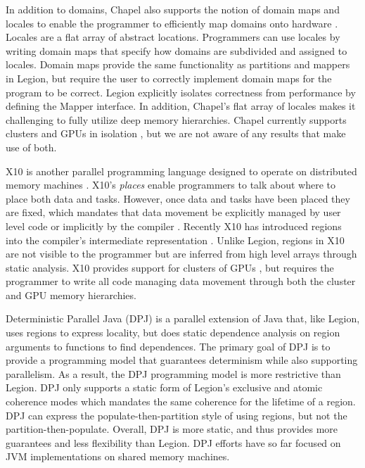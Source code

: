 In addition to domains, Chapel also supports the notion of domain maps and locales to enable 
the programmer to efficiently map domains onto hardware \cite{CHAPEL11}.  Locales are a flat array
of abstract locations.  Programmers can use locales by writing domain maps that specify
how domains are subdivided and assigned to locales.  Domain maps provide the same functionality
as partitions and mappers in Legion, but require the user to correctly implement domain
maps for the program to be correct.  Legion explicitly isolates correctness
from performance by defining the Mapper interface.  In addition, Chapel's flat array of locales
makes it challenging to fully utilize deep memory hierarchies.  Chapel currently supports
clusters and GPUs in isolation \cite{CHAPELGPU}, but we are not aware of any results that 
make use of both.

X10 is another parallel programming language designed to operate on
distributed memory machines \cite{X1005}.  X10's {\em places} enable
programmers to talk about where to place both data and tasks.
However, once data and tasks have been placed they are fixed, which
mandates that data movement be explicitly managed by user level code
or implicitly by the compiler \cite{X1008}.  Recently X10
has introduced regions into the compiler's
intermediate representation \cite{X1011}.  Unlike Legion, regions in
X10 are not visible to the programmer but are inferred from high level
arrays through static analysis.  X10 provides support for clusters of
GPUs \cite{X10GPU}, but requires the programmer to write all code
managing data movement through both the cluster and GPU memory
hierarchies.

Deterministic Parallel Java (DPJ) is a parallel extension of Java
that, like Legion, uses regions to express locality, but does
static dependence analysis on region
arguments to functions to find dependences\cite{Bocchino09}.  The primary goal of DPJ 
is to provide a programming model that
guarantees determinism while also supporting parallelism.
As a result, the DPJ programming model is more restrictive than Legion.  
DPJ only supports a static form of Legion's exclusive and atomic 
coherence modes which mandates the same coherence for the lifetime
of a region.  DPJ can express
the populate-then-partition style of using regions, but not the
partition-then-populate.  Overall, DPJ is more static, and
thus provides more guarantees and less flexibility than Legion.  
DPJ efforts have so far focused on JVM implementations on shared memory machines.

